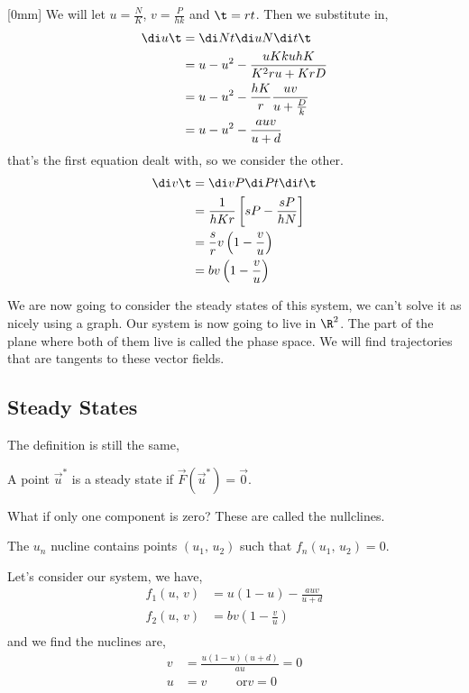 
\noindent{}[0mm]
We will let $u = \frac{N}{K}$, $v = \frac{P}{hk}$ and $\t = rt$. Then we substitute in,
\begin{align*}
  \di u \t &= \di N t \di u N \di t \t\\
  &= u - u^2 - \frac{uKk uhK}{K^2ru + KrD}\\
  &= u - u^2 - \frac{hK}{r}\frac{uv}{u + \frac{D}{k}}\\
  &= u - u^2 - \frac{auv}{u + d}
\end{align*}
that's the first equation dealt with, so we consider the other.
\begin{align*}
  \di v \t &= \di v P \di P t \di t \t \\
  &= \frac{1}{hKr} \left[ sP - \frac{sP}{hN} \right]\\
  &= \frac{s}{r}v \left(1 - \frac{v}{u}\right)\\
  &= bv\left( 1 - \frac{v}{u} \right)
\end{align*}

We are now going to consider the steady states of this system, we can't solve it as nicely using a graph. Our system is now going to live in $\R^2$. The part of the plane where both of them live is called the phase space. We will find trajectories that are tangents to these vector fields.\\

\subsection{Steady States}
The definition is still the same,
\begin{ndefi}
  A point $\vec u^*$ is a steady state if $\vec F(\vec u^*) = \vec 0$.
\end{ndefi}
What if only one component is zero? These are called the nullclines.
\begin{ndefi}[Nullclines]
  The $u_n$ nucline contains points $(u_1,\,u_2)$ such that $f_n(u_1, \, u_2) = 0$.
\end{ndefi}

Let's consider our system, we have,
\begin{align*}
  f_1(u,\,v) &= u(1- u) - \frac{auv}{u + d}\\
  f_2(u,\,v) &= bv \left(1 - \frac{v}{u}\right)\\
\end{align*}
and we find the nuclines are,
\begin{align*}
  v &= \frac{u(1 - u)(u + d)}{au} = 0\\
  u &= v \qquad \text{ or} v = 0
\end{align*}


